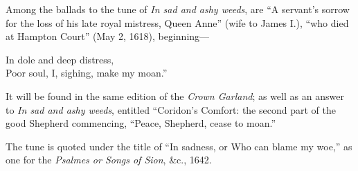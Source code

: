 Among the ballads to the tune of \textit{In sad and ashy weeds}, are “A servant’s
sorrow for the loss of his late royal mistress, Queen Anne” (wife to James I.),
“who died at Hampton Court” (May 2, 1618), beginning—
\settowidth{\versewidth}{In dole and deep distress,}
\begin{scverse}
In dole and deep distress,\\
Poor soul, I, sighing, make my moan.”
\end{scverse}
It will be found in the same edition of the \textit{Crown Garland}; as well as an answer
to \textit{In sad and ashy weeds}, entitled “Coridon’s Comfort: the second part of the
good Shepherd commencing, “Peace, Shepherd, cease to moan.”

The tune is quoted under the title of “In sadness, or Who can blame my woe,”
as one for the \textit{Psalmes or Songs of Sion}, \&c., 1642.

\pagebreak



\vspace{-2\baselineskip}

